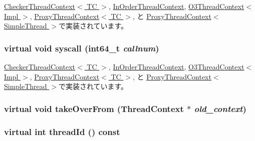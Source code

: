 \hyperlink{classCheckerThreadContext_a197ef8a0b017208563e0a899c69559e8}{CheckerThreadContext$<$ TC $>$}, \hyperlink{classInOrderThreadContext_a32072550286c5735b4b95349efa8e4f6}{InOrderThreadContext}, \hyperlink{classO3ThreadContext_a32072550286c5735b4b95349efa8e4f6}{O3ThreadContext$<$ Impl $>$}, \hyperlink{classProxyThreadContext_a32072550286c5735b4b95349efa8e4f6}{ProxyThreadContext$<$ TC $>$}, と \hyperlink{classProxyThreadContext_a32072550286c5735b4b95349efa8e4f6}{ProxyThreadContext$<$ SimpleThread $>$}で実装されています。\hypertarget{classThreadContext_ae5fdd7da5d82e981c65cbd6115dcfe60}{
\subsubsection[{syscall}]{\setlength{\rightskip}{0pt plus 5cm}virtual void syscall (int64\_\-t {\em callnum})}}
\label{classThreadContext_ae5fdd7da5d82e981c65cbd6115dcfe60}


\hyperlink{classCheckerThreadContext_a36e0b96120fcbbc2ee8699158f7be5c2}{CheckerThreadContext$<$ TC $>$}, \hyperlink{classInOrderThreadContext_a36e0b96120fcbbc2ee8699158f7be5c2}{InOrderThreadContext}, \hyperlink{classO3ThreadContext_a064ef126d662dea947c40adfa6b5a490}{O3ThreadContext$<$ Impl $>$}, \hyperlink{classProxyThreadContext_a36e0b96120fcbbc2ee8699158f7be5c2}{ProxyThreadContext$<$ TC $>$}, と \hyperlink{classProxyThreadContext_a36e0b96120fcbbc2ee8699158f7be5c2}{ProxyThreadContext$<$ SimpleThread $>$}で実装されています。\hypertarget{classThreadContext_ace6314826c59aeddaa2c1091bb3d92e1}{
\subsubsection[{takeOverFrom}]{\setlength{\rightskip}{0pt plus 5cm}virtual void takeOverFrom ({\bf ThreadContext} $\ast$ {\em old\_\-context})}}
\label{classThreadContext_ace6314826c59aeddaa2c1091bb3d92e1}
\hypertarget{classThreadContext_a79882224329589b18076ee3f2f45d99f}{
\subsubsection[{threadId}]{\setlength{\rightskip}{0pt plus 5cm}virtual int threadId () const}}
\label{classThreadContext_a79882224329589b18076ee3f2f45d99f}



